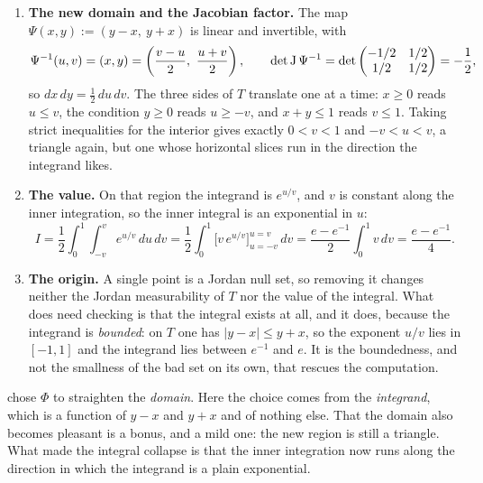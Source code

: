 \begin{exercisesolution}
\label{sol:ai_triangle_substitution}
\begin{enumerate}[label=\textbf{(\alph*)}]
  \item \textbf{The new domain and the Jacobian factor.} The map $\Psi(x,y) := (y-x,\ y+x)$ is
    linear and invertible, with
    \[\Psi^{-1}(u,v) = (x,y) = \left(\frac{v-u}{2},\ \frac{u+v}{2}\right),
      \qquad
      \det\Jac\Psi^{-1} = \det\begin{pmatrix} -1/2 & 1/2 \\ 1/2 & 1/2\end{pmatrix} = -\frac12,\]
    so $dx\,dy = \tfrac12\,du\,dv$. The three sides of $T$ translate one at a time: $x \geq 0$
    reads $u \leq v$, the condition $y \geq 0$ reads $u \geq -v$, and $x+y \leq 1$ reads
    $v \leq 1$. Taking strict inequalities for the interior gives exactly $0 < v < 1$ and
    $-v < u < v$, a triangle again, but one whose horizontal slices run in the direction the
    integrand likes.
  \item \textbf{The value.} On that region the integrand is $e^{u/v}$, and $v$ is constant along
    the inner integration, so the inner integral is an exponential in $u$:
    \[I = \frac12\int_0^1\!\!\int_{-v}^{v} e^{u/v}\,du\,dv
        = \frac12\int_0^1 \Big[v\,e^{u/v}\Big]_{u=-v}^{u=v}\,dv
        = \frac{e - e^{-1}}{2}\int_0^1 v\,dv
        = \frac{e - e^{-1}}{4}.\]
  \item \textbf{The origin.} A single point is a Jordan null set, so removing it changes neither
    the Jordan measurability of $T$ nor the value of the integral. What does need checking is
    that the integral exists at all, and it does, because the integrand is \emph{bounded}: on $T$
    one has $\lvert y-x\rvert \leq y+x$, so the exponent $u/v$ lies in $[-1,1]$ and the integrand
    lies between $e^{-1}$ and $e$. It is the boundedness, and not the smallness of the bad set on
    its own, that rescues the computation.
\end{enumerate}

\begin{remark}
\label{rem:substitution_from_the_integrand}
 chose $\Phi$ to straighten the \emph{domain}. Here the
choice comes from the \emph{integrand}, which is a function of $y-x$ and $y+x$ and of nothing
else. That the domain also becomes pleasant is a bonus, and a mild one: the new region is still
a triangle. What made the integral collapse is that the inner integration now runs along the
direction in which the integrand is a plain exponential.
\end{remark}
\end{exercisesolution}

